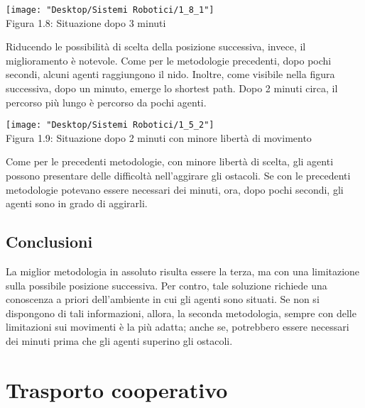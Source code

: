 \documentclass[12pt,a4paper,openright,twoside]{report}
\begin{document}
\begin{center}  
	\texttt{[image: "Desktop/Sistemi Robotici/1\_8\_1"]}
	\\Figura 1.8: Situazione dopo 3 minuti
\end{center}

Riducendo le possibilità di scelta della posizione successiva, invece, il miglioramento è notevole. Come per le metodologie precedenti, dopo pochi secondi, alcuni agenti raggiungono il nido. Inoltre, come visibile nella figura successiva, dopo un minuto, emerge lo shortest path. Dopo 2 minuti circa, il percorso più lungo è percorso da pochi agenti.\\

\begin{center}  
	\texttt{[image: "Desktop/Sistemi Robotici/1\_5\_2"]}
	\\Figura 1.9: Situazione dopo 2 minuti con minore libertà di movimento
\end{center}

Come per le precedenti metodologie, con minore libertà di scelta, gli agenti possono presentare delle difficoltà nell'aggirare gli ostacoli. Se con le precedenti metodologie potevano essere necessari dei minuti, ora, dopo pochi secondi, gli agenti sono in grado di aggirarli.

\subsection{Conclusioni}

La miglior metodologia in assoluto risulta essere la terza, ma con una limitazione sulla possibile posizione successiva. Per contro, tale soluzione richiede una conoscenza a priori dell'ambiente in cui gli agenti sono situati. Se non si dispongono di tali informazioni, allora, la seconda metodologia, sempre con delle limitazioni sui movimenti è la più adatta; anche se, potrebbero essere necessari dei minuti prima che gli agenti superino gli ostacoli.

\section{Trasporto cooperativo}
\end{document}
